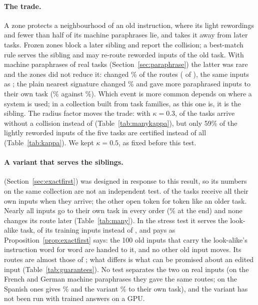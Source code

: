 \paragraph{The trade.} A zone protects a neighbourhood of an old instruction, where its light rewordings and fewer than half of its machine paraphrases lie, and takes it away from later tasks. Frozen zones block a later sibling and report the collision; a best-match rule serves the sibling and may re-route reworded inputs of the old task. With machine paraphrases of \WidenTasksEval{} real tasks (Section~\ref{sec:paraphrase}) the latter was rare and the zones did not reduce it:
\nearest{} changed \RerouteNearChanged{}\% of the routes (\RerouteNearNChanged{} of \RerouteInputs{}), the same \RerouteCertNChanged{} inputs as \cert{}; the plain nearest signature changed \RerouteSigChanged{}\% and gave more paraphrased inputs to their own task (\RerouteSigOwnEnd{}\% against \RerouteCertOwnEnd{}\%). Which event is more common depends on where a system is used; in a collection built from task
families, as this one is, it is the sibling. The radius factor moves the trade: with
$\kappa = 0.3$, \ManyCleanKappaThree{} of the \ManyTasks{} tasks arrive without a collision
instead of \ManyClean{} (Table~\ref{tab:manykappa}), but only 59\% of the lightly
reworded inputs of the five tasks are certified instead of all (Table~\ref{tab:kappa}). We
kept $\kappa = 0.5$, as fixed before this test.

\paragraph{A variant that serves the siblings.} \exactfirst{} (Section~\ref{sec:exactfirst}) was designed in response to this result, so its numbers on the same
collection are not an independent test. \ExactTasksOwn{} of the \ManyTasks{} tasks receive
all their own inputs when they arrive; the other \ExactTasksNone{} open token for token like an older
task. Nearly all inputs go to their own task in every order (\ExactRightPct{}\% at the end)
and none changes its route later (Table~\ref{tab:many}). In the stress test it serves the look-alike task, \ExactStressOwn{} of its
\StressTrain{} training inputs instead of \CertStressOwn{}, and pays as
Proposition~\ref{prop:exactfirst} says: the 100 old inputs that carry the look-alike's instruction
word for word are handed to it, and no other old input moves. Its routes are almost those of \nearest{}; what differs is what can be promised about an edited input
(Table~\ref{tab:guarantees}). No test separates the two on real inputs (on the French and German machine paraphrases they gave the same routes; on the Spanish ones \nearest{} gives \RerouteNearEsOwn{}\% and the variant \RerouteExactEsOwn{}\% to their own task), and the
variant has not been run with trained answers on a GPU.


